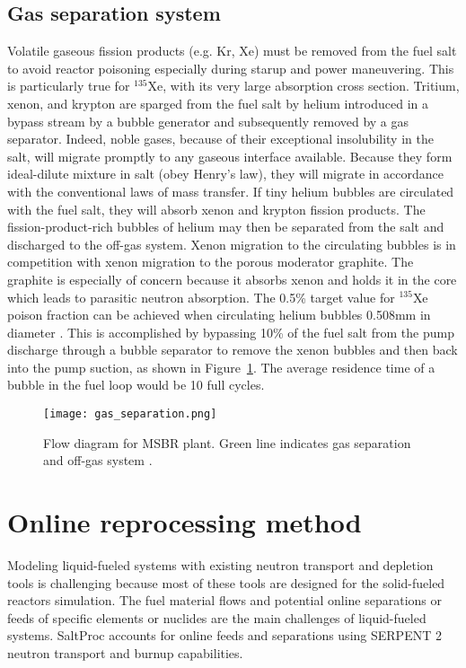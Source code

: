 \subsection{Gas separation system}
Volatile gaseous fission products (e.g. Kr, Xe) must be removed from the fuel salt to avoid reactor poisoning especially during starup and power maneuvering. This is particularly true for $^{135}$Xe, with its very large absorption cross section. Tritium, xenon, and krypton are sparged from the fuel salt by helium introduced in a bypass stream by a bubble generator and subsequently removed by a gas separator. Indeed, noble gases, because of their exceptional insolubility in the salt, will migrate promptly to any gaseous interface available. Because they form ideal-dilute mixture in salt (obey Henry's law), they will migrate in accordance with the conventional laws of mass transfer. If tiny helium bubbles are circulated with the fuel salt, they will absorb xenon and krypton fission products. The fission-product-rich bubbles of helium may then be separated from the salt and discharged to the off-gas system. Xenon migration to the circulating bubbles is in competition with xenon migration to the porous moderator graphite. The graphite is especially of concern because it absorbs xenon and holds it in the core which leads to parasitic neutron absorption. The 0.5\% target value for $^{135}$Xe poison fraction can be achieved when circulating helium bubbles 0.508mm in diameter \cite{robertson_conceptual_1971}. This is accomplished by bypassing 10\% of the fuel salt from the pump discharge through a bubble separator to remove the xenon bubbles and then back into the pump suction, as shown in Figure~\ref{fig:gas_removal_system}. The average residence time of a bubble in the fuel loop would be 10 full cycles.

\begin{figure}[htp!] %
  \centering
  \vspace{-0.3em}
  \texttt{[image: gas\_separation.png]}
  \caption{Flow diagram for \gls{MSBR} plant. Green line indicates gas separation and off-gas system \cite{robertson_conceptual_1971}.}
  \vspace{-0.6em}
  \label{fig:gas_removal_system}
\end{figure}
\FloatBarrier
\section{Online reprocessing method}
Modeling liquid-fueled systems with existing neutron transport and depletion tools is challenging because most of these tools are designed for the solid-fueled reactors simulation. The fuel material flows and potential online separations or feeds of specific elements or nuclides are the main challenges of liquid-fueled systems. SaltProc accounts for online feeds and separations using SERPENT 2 neutron transport and burnup capabilities.

